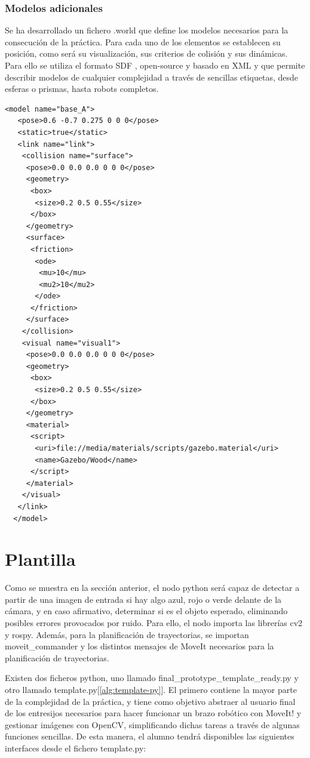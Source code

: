 \documentclass[12pt,spanish,chapterprefix, numbers=noenddot]{book}
\numberwithin{equation}{section}
\numberwithin{figure}{section}
\begin{document}
\subsubsection{Modelos adicionales}
Se ha desarrollado un fichero .world que define los modelos necesarios para la consecución de la práctica. Para cada uno de los elementos se establecen su posición, como será su visualización, sus criterios de colisión y sus dinámicas. 
Para ello se utiliza el formato SDF \cite{sdf_format}, open-source y basado en XML y que permite describir modelos de cualquier complejidad a través de sencillas etiquetas, desde esferas o prismas, hasta robots completos.

\vspace{20pt}
	\begin{lstlisting}[frame=single]
  <model name="base_A">
   <pose>0.6 -0.7 0.275 0 0 0</pose>
   <static>true</static>
   <link name="link">
    <collision name="surface">
     <pose>0.0 0.0 0.0 0 0 0</pose>
     <geometry>
      <box>
       <size>0.2 0.5 0.55</size>
      </box>
     </geometry>
     <surface>
      <friction>
       <ode>
        <mu>10</mu>
        <mu2>10</mu2>
       </ode>
      </friction>
     </surface>
    </collision>
    <visual name="visual1">
     <pose>0.0 0.0 0.0 0 0 0</pose>
     <geometry>
      <box>
       <size>0.2 0.5 0.55</size>
      </box>
     </geometry>
     <material>
      <script>
       <uri>file://media/materials/scripts/gazebo.material</uri>
       <name>Gazebo/Wood</name>
      </script>
     </material>
    </visual>
   </link>
  </model>
	\end{lstlisting}

\section{Plantilla}
Como se muestra en la sección anterior, el nodo python será capaz de detectar a partir de una imagen de entrada si hay algo azul, rojo o verde delante de la cámara, y en caso afirmativo, determinar si es el objeto esperado, eliminando posibles errores provocados por ruido. 
Para ello, el nodo importa las librerías cv2 y rospy. Además, para la planificación de trayectorias, se importan moveit\_commander y los distintos mensajes de MoveIt necesarios para la planificación de trayectorias.

Existen dos ficheros python, uno llamado final\_prototype\_template\_ready.py y otro llamado template.py[\ref{alg:template-py}]. 
El primero contiene la mayor parte de la complejidad de la práctica, y tiene como objetivo abstraer al usuario final de los entresijos necesarios para hacer funcionar un brazo robótico con MoveIt! y gestionar imágenes con OpenCV, simplificando dichas tareas a través de algunas funciones sencillas. 
De esta manera, el alumno tendrá disponibles las siguientes interfaces desde el fichero template.py: 
\end{document}
